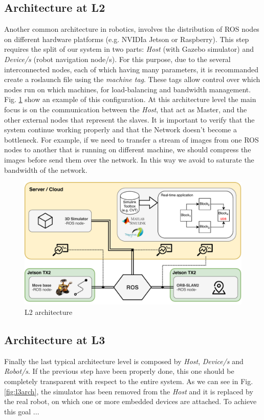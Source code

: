 \subsection{Architecture at L2} %
Another common architecture in robotics, involves the distribution of ROS nodes on different hardware platforms (e.g. NVIDIa Jetson or Raspberry). 
This step requires the split of our system in two parts: \textit{Host} (with Gazebo simulator) and \textit{Device/s} (robot navigation node/s). For this purpose, due to the several interconnected nodes, each of which having many parameters, it is recommanded create a roslaunch file  using the \textit{machine tag}. These tags allow control over which nodes run on which machines, for load-balancing and bandwidth management. Fig. \ref{fig:l2arch} show an example of this configuration. At this architecture level the main focus is on the communication between the \textit{Host}, that act as Master, and the other external nodes that represent the slaves. It is important to verify that the system continue working properly and that the Network doesn't become a bottleneck. For example, if we need to transfer a stream of images from one ROS nodes to another that is running on different machine, we should compress the images before send them over the network. In this way we avoid to saturate the bandwidth of the network.

\begin{figure}
	\centering
	\includegraphics[width=\textwidth]{images/L2-arch}
	\caption{L2 architecture}
	\label{fig:l2arch}
\end{figure}




\subsection{Architecture at L3}	%
Finally the last typical architecture level is composed by \textit{Host}, \textit{Device/s } and  \textit{Robot/s}. If the previous step have been properly done, this one should be completely 
transparent with respect to the entire system. 
As we can see in Fig. \ref{fig:l3arch}, the simulator has been removed from the \textit{Host} and it is replaced by the real robot, on which one or more embedded devices are attached.
To achieve this goal ... 


